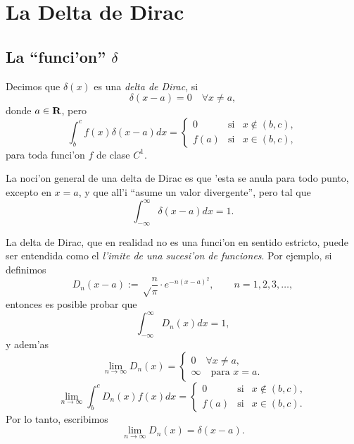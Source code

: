\chapter{La Delta de Dirac}\label{app:Dirac}
\section{La ``funci'on'' $\delta$}
Decimos que $\delta(x)$ es una \textit{delta de Dirac}, si
\begin{equation}
\delta (x-a) = 0\quad \forall x\not = a,
\end{equation}
donde $a\in {\bf R}$, pero
\begin{equation}
\int_b^cf(x)\delta(x-a) d x = \left\{\begin{array}{ccl}
 0 & \text{si} & x\notin (b,c) ,\\
f(a)& \text{si} & x\in (b,c) ,
\end{array}\right.
\end{equation}
para toda funci'on $f$ de clase $C^1$.

 La noci'on general de una delta de Dirac es que 'esta se anula para todo punto,
excepto en $x=a$, y que all'i ``asume un valor divergente'', pero tal que
\begin{equation}
  \int_{-\infty}^{\infty}\delta(x-a)d x = 1.
 \end{equation}
 
 La delta de Dirac, que en realidad no es una funci'on en sentido estricto,
puede ser entendida como el \textit{l'imite de una sucesi'on de funciones}.
Por ejemplo, si definimos
\begin{equation}
  D_n(x-a) := \sqrt\frac n\pi\cdot e^{-n(x-a)^2}, \qquad n=1,2,3,\dots,
\end{equation}
entonces es posible probar que
\begin{equation}
\int_{-\infty}^{\infty}D_n(x) d x =  1,
\end{equation}
y adem'as
\begin{equation}
\lim_{n\to\infty} D_n(x) =  \left\{\begin{array}{l}0 \quad \forall x\neq
a,\\\infty \quad \text{para }      x=a.\end{array}\right.
\end{equation}
\begin{equation}
\lim_{n\to\infty}\int_b^cD_n(x)f(x)d x = \left\{\begin{array}{ccl}
 0 & \text{si} & x\notin (b,c) ,\\
f(a)& \text{si} & x\in (b,c) .
\end{array}\right.
\end{equation}
Por lo tanto, escribimos
\begin{equation}
  \lim_{n\to\infty}D_n(x)=\delta(x-a).
 \end{equation}
 
